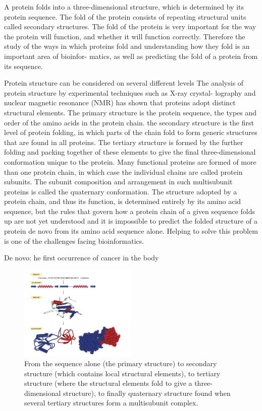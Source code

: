 \documentclass{article}
\begin{document}
A protein folds into a three-dimensional structure, which is determined by its protein sequence. The fold of the protein consists of repeating structural units called secondary structures. The fold of the protein is very important for the way the protein will function, and whether it will function correctly. Therefore the study of the ways in which proteins fold and understanding how they fold is an important area of bioinfor- matics, as well as predicting the fold of a protein from its sequence.

Protein structure can be considered on several different levels
The analysis of protein structure by experimental techniques such as X-ray crystal- lography and nuclear magnetic resonance (NMR) has shown that proteins adopt distinct structural elements. The primary structure is the protein sequence, the types and order of the amino acids in the protein chain. the secondary structure is the first level of protein folding, in which parts of the chain fold to form generic structures that are found in all proteins. The tertiary structure is formed by the further folding and packing together of these elements to give the final three-dimensional conformation unique to the protein. Many functional proteins are formed of more than one protein chain, in which case the individual chains are called protein subunits. The subunit composition and arrangement in such multisubunit proteins is called the quaternary conformation. The structure adopted by a protein chain, and thus its function, is determined entirely by its amino acid sequence, but the rules that govern how a protein chain of a given sequence folds up are not yet understood and it is impossible to predict the folded structure of a protein de novo from its amino acid sequence alone. Helping to solve this problem is one of the challenges facing bioinformatics.

De novo: he first occurrence of cancer in the body

\begin{figure}
    \centering
    \includegraphics[width=0.5\textwidth]{Protein Structure.png}
    \caption{\label{fig:Simple schematic showing the different levels of protein structure.}From the sequence alone (the primary structure) to secondary structure (which contains local structural elements), to tertiary structure (where the structural elements fold to give a three-dimensional structure), to finally quaternary structure found when several tertiary structures form a multisubunit complex.}
\end{figure}
\end{document}
